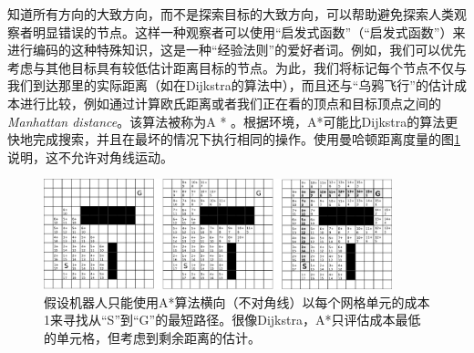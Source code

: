 知道所有方向的大致方向，而不是探索目标的大致方向，可以帮助避免探索人类观察者明显错误的节点。这样一种观察者可以使用“启发式函数”（“启发式函数”）来进行编码的这种特殊知识，这是一种“经验法则”的爱好者词。例如，我们可以优先考虑与其他目标具有较低估计距离目标的节点。为此，我们将标记每个节点不仅与我们到达那里的实际距离（如在Dijkstra的算法中），而且还与“乌鸦飞行”的估计成本进行比较，例如通过计算欧氏距离或者我们正在看的顶点和目标顶点之间的\emph{Manhattan distance}。该算法被称为A * \cite{hart1968formal}。根据环境，A*可能比Dijkstra的算法更快地完成搜索，并且在最坏的情况下执行相同的操作。使用曼哈顿距离度量的图\ref{fig:astargrid}说明，这不允许对角线运动。


\begin{figure}[htb]
\centering
\includegraphics[width=0.9\textwidth]{figs/astargrid}
\caption{假设机器人只能使用A*算法横向（不对角线）以每个网格单元的成本1来寻找从“S”到“G”的最短路径。很像Dijkstra，A*只评估成本最低的单元格，但考虑到剩余距离的估计。\label{fig:astargrid}}
\end{figure}





